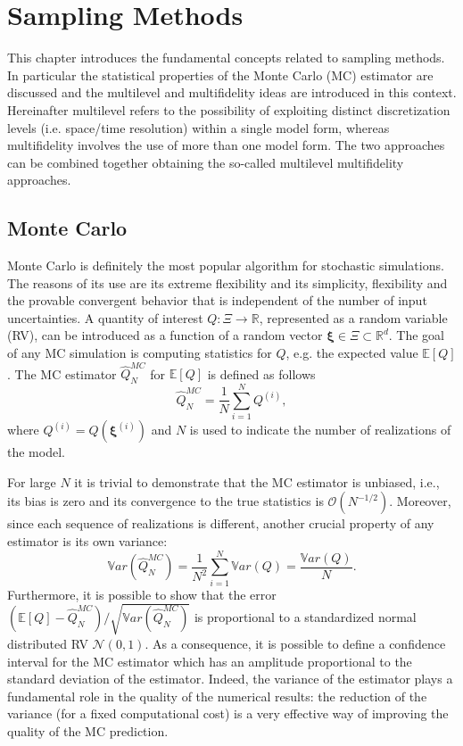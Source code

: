 \chapter{Sampling Methods}\label{uq:sampling}


This chapter introduces the fundamental concepts related to sampling methods. In
particular the statistical properties of the Monte Carlo (MC) estimator
are discussed and the multilevel and multifidelity ideas are introduced 
in this context. Hereinafter multilevel refers to the possibility of exploiting
distinct discretization levels (i.e. space/time resolution) within a single
model form, whereas multifidelity involves the use of more than one model form.
The two approaches can be combined together obtaining the so-called multilevel
multifidelity approaches.

\section{Monte Carlo} \label{uq:sampling:montecarlo}
Monte Carlo is definitely the most popular algorithm for stochastic simulations. The reasons of its use are its
extreme flexibility and its simplicity, flexibility and the provable convergent behavior that is independent 
of the number of input uncertainties. A quantity of interest $Q: \Xi \rightarrow \mathbb{R}$, represented as a random variable (RV), 
can be introduced as a function of a random vector $\boldsymbol{\xi} \in \Xi \subset \mathbb{R}^d$. The goal of any MC simulation is computing 
statistics for $Q$, e.g. the expected value $\mathbb{E}\left[Q\right]$. The MC estimator $\hat{Q}_N^{MC}$ for 
$\mathbb{E}\left[Q\right]$ is defined as follows
\begin{equation}
\hat{Q}_N^{MC} = \dfrac{1}{N} \sum_{i=1}^N Q^{(i)},
\end{equation}
where $Q^{(i)} = Q(\boldsymbol{\xi}^{(i)})$ and $N$ is used to indicate the number of realizations of the model. 

For large $N$ it is trivial to demonstrate that the MC estimator is unbiased, i.e., its bias is zero and its convergence
to the true statistics is $\mathcal{O}(N^{-1/2})$. Moreover, since each sequence of realizations is different, another crucial property 
of any estimator is its own variance:
\begin{equation}\label{EQ: variance MC}
 \mathbb{V}ar\left( \hat{Q}_N^{MC} \right)  = \dfrac{1}{N^2} \sum_{i=1}^{N} \mathbb{V}ar\left( Q \right) 
            = \dfrac{\mathbb{V}ar\left(Q\right) }{N}.
\end{equation}
Furthermore, it is possible to show that the error $\left( \mathbb{E}\left[Q\right] - \hat{Q}_N^{MC} \right)/\sqrt{ \mathbb{V}ar\left( \hat{Q}_N^{MC} \right) }$ is proportional to 
a standardized normal distributed RV $\mathcal{N}(0,1)$. As a consequence, it is possible to define a confidence
interval for the MC estimator which has an amplitude proportional to the standard deviation of the estimator.
Indeed, the variance of the estimator plays a fundamental role in the quality of the
numerical results: the reduction of the variance (for a fixed computational cost) 
is a very effective way of improving the quality of the MC prediction. 

